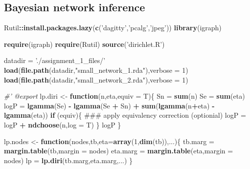 \documentclass[]{article}
\newenvironment{Shaded}{\begin{snugshade}}{\end{snugshade}}
\newcommand{\KeywordTok}[1]{\textcolor[rgb]{0.13,0.29,0.53}{\textbf{#1}}}
\newcommand{\DataTypeTok}[1]{\textcolor[rgb]{0.13,0.29,0.53}{#1}}
\newcommand{\DecValTok}[1]{\textcolor[rgb]{0.00,0.00,0.81}{#1}}
\newcommand{\StringTok}[1]{\textcolor[rgb]{0.31,0.60,0.02}{#1}}
\newcommand{\CommentTok}[1]{\textcolor[rgb]{0.56,0.35,0.01}{\textit{#1}}}
\newcommand{\ControlFlowTok}[1]{\textcolor[rgb]{0.13,0.29,0.53}{\textbf{#1}}}
\newcommand{\OperatorTok}[1]{\textcolor[rgb]{0.81,0.36,0.00}{\textbf{#1}}}
\newcommand{\NormalTok}[1]{#1}
\theoremstyle{definition}
\theoremstyle{definition}
\theoremstyle{definition}
\theoremstyle{remark}
\begin{document}
\subsection{Bayesian network
inference}\label{bayesian-network-inference}

\begin{Shaded}
\begin{Highlighting}[]
\NormalTok{Rutil}\OperatorTok{::}\KeywordTok{install.packages.lazy}\NormalTok{(}\KeywordTok{c}\NormalTok{(}\StringTok{'dagitty'}\NormalTok{,}\StringTok{'pcalg'}\NormalTok{,}\StringTok{'jpeg'}\NormalTok{))}
\KeywordTok{library}\NormalTok{(igraph)}

\KeywordTok{require}\NormalTok{(igraph)}
\KeywordTok{require}\NormalTok{(Rutil)}
\KeywordTok{source}\NormalTok{(}\StringTok{'dirichlet.R'}\NormalTok{)}

\NormalTok{datadir =}\StringTok{ './assignment_1_files/'}
\KeywordTok{load}\NormalTok{(}\KeywordTok{file.path}\NormalTok{(datadir,}\StringTok{"small_network_1.rda"}\NormalTok{),}\DataTypeTok{verbose =} \DecValTok{1}\NormalTok{)}
\KeywordTok{load}\NormalTok{(}\KeywordTok{file.path}\NormalTok{(datadir,}\StringTok{"small_network_2.rda"}\NormalTok{),}\DataTypeTok{verbose =} \DecValTok{1}\NormalTok{)}


\CommentTok{#' @export}
\NormalTok{lp.diri <-}\StringTok{ }\ControlFlowTok{function}\NormalTok{(n,eta,}\DataTypeTok{equiv =}\NormalTok{ T)\{}
\NormalTok{  Sn =}\StringTok{ }\KeywordTok{sum}\NormalTok{(n)}
\NormalTok{  Se =}\StringTok{ }\KeywordTok{sum}\NormalTok{(eta)}
\NormalTok{  logP =}\StringTok{ }\KeywordTok{lgamma}\NormalTok{(Se) }\OperatorTok{-}\StringTok{ }\KeywordTok{lgamma}\NormalTok{(Se }\OperatorTok{+}\StringTok{ }\NormalTok{Sn) }\OperatorTok{+}\StringTok{ }\KeywordTok{sum}\NormalTok{(}\KeywordTok{lgamma}\NormalTok{(n}\OperatorTok{+}\NormalTok{eta) }\OperatorTok{-}\StringTok{ }\KeywordTok{lgamma}\NormalTok{(eta))}
  \ControlFlowTok{if}\NormalTok{ (equiv)\{}
\NormalTok{    ### apply equivalency correction (optionial)}
\NormalTok{    logP =}\StringTok{ }\NormalTok{logP }\OperatorTok{+}\StringTok{ }\KeywordTok{ndchoose}\NormalTok{(n,}\DataTypeTok{log =}\NormalTok{ T)}
\NormalTok{  \}}
\NormalTok{  logP}
\NormalTok{\}}


\NormalTok{lp.nodes <-}\StringTok{ }\ControlFlowTok{function}\NormalTok{(nodes,tb,}\DataTypeTok{eta=}\KeywordTok{array}\NormalTok{(}\DecValTok{1}\NormalTok{,}\KeywordTok{dim}\NormalTok{(tb)),...)\{}
\NormalTok{  tb.marg =}\StringTok{ }\KeywordTok{margin.table}\NormalTok{(tb,}\DataTypeTok{margin =}\NormalTok{ nodes)}
\NormalTok{  eta.marg =}\StringTok{ }\KeywordTok{margin.table}\NormalTok{(eta,}\DataTypeTok{margin =}\NormalTok{ nodes)}
\NormalTok{  lp =}\StringTok{ }\KeywordTok{lp.diri}\NormalTok{(tb.marg,eta.marg,...)}
\NormalTok{\}}


\end{Highlighting}
\end{Shaded}
\end{document}
